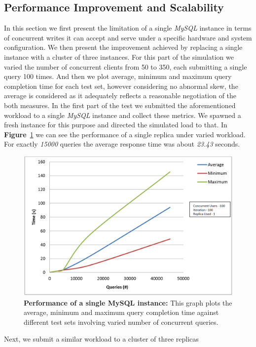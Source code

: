 \documentclass[12pt]{article}
\begin{document}
\subsection{Performance Improvement and Scalability} 
In this section we first present the limitation of a single \emph{MySQL} instance
in terms of concurrent writes it can accept and serve under a specific hardware
and system configuration. We then present the improvement achieved by replacing
a single instance with a cluster of three instances. For this part of the
simulation we varied the number of concurrent clients from 50 to 350, each
submitting a single query 100 times. And then we plot average, minimum and
maximum query completion time for each test set, however considering no abnormal skew, the average is considered
as it adequately reflects a reasonable negotiation of the both
measures. In the first part of the test we submitted the aforementioned workload
to a single \emph{MySQL} instance and collect these metrics. We spawned a fresh
instance for this purpose and directed the simulated load to that. In
\textbf{Figure}~\ref{fig:singlereplica} we can see the performance of a single
replica under varied workload. For exactly \emph{15000} queries the average
response time was about \emph{23.43} seconds.  
\begin{figure}[H] 
\centering
\includegraphics[scale=0.45]{Images/graph_singlereplica.PNG}
\caption{\textbf{Performance of a single MySQL instance:} This graph plots the
average, minimum and maximum query completion time against different test sets
involving varied number of concurrent queries. } \label{fig:singlereplica}
\end{figure} 
Next, we submit a similar workload to a cluster of three replicas
\end{document}

